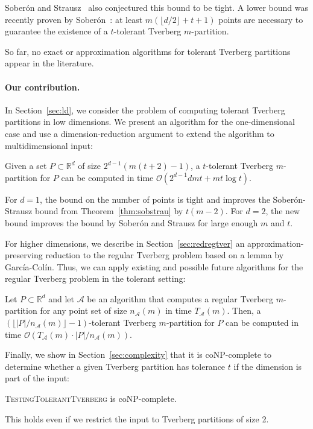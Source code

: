 \documentclass[oribibl,envcountsame,envcountsect]{llncs}
\newcommand{\mc}[1]{\ensuremath{\mathcal{#1}}}
\newcommand{\bo}[1]{\mathcal{O}(#1)}
\newcommand{\real}{\mathbb{R}}
\newcommand{\Soberon}{Sober\'{o}n}
\newcommand{\GarciaColin}{Garc\'{i}a-Col\'{i}n}
\begin{document}
\Soberon{} and Strausz~\cite{Soberon2012} also
conjectured this bound to be tight. A lower bound was recently
proven by \Soberon{}~\cite{Soberon2014}: at least
$m(\lfloor d/2\rfloor + t + 1)$ points are necessary to guarantee the
existence of a $t$-tolerant Tverberg $m$-partition.

So far,
no exact or approximation algorithms for tolerant Tverberg partitions appear in
the literature.

\paragraph{Our contribution.}
\newenvironment{prfTODO}{\begin{proof}[TODO]}{\qed\end{proof}}

In Section~\ref{sec:ld}, we consider the problem of computing
tolerant Tverberg partitions in low dimensions. We present an
algorithm for the one-dimensional case and use a dimension-reduction
argument to extend the algorithm to multidimensional input:
\begin{theorem}\label{thm:dr_tverberg}
  Given a set $P\subset \real^{d}$ of size $2^{d-1}(m(t+2) - 1)$,
  a $t$-tolerant Tverberg $m$-partition
  for $P$ can be computed in time $\bo{2^{d-1}dmt + mt \log t}$.
\end{theorem}
For $d=1$, the bound on the number of points is tight and improves
the \Soberon{}-Strausz bound from Theorem~\ref{thm:sobstrau} by
$t(m-2)$. For $d=2$, the new bound improves the bound
by \Soberon{} and Strausz for large enough $m$ and $t$.

For higher dimensions, we describe in Section~\ref{sec:redregtver} an
approximation-preserving reduction to the regular Tverberg problem based on a
lemma by \GarciaColin{}. Thus, we
can apply existing and possible future algorithms for the regular Tverberg
problem in the tolerant setting:

\begin{proposition} \label{apr:prop:cb}
  Let $P\subset \real^d$ and let $\mc{A}$ be an
  algorithm that computes a regular Tverberg $m$-partition
  for any point set of size $n_\mc{A}(m)$ in time $T_{\mc{A}}(m)$.
  Then, a $\left(\lfloor |P|/n_{\mc{A}}(m) \rfloor -1\right)$-tolerant Tverberg
  $m$-partition for $P$ can be computed in time
  $\mc{O}\left(T_{\mc{A}}(m) \cdot |P| / n_{\mc{A}}(m) \right)$.
\end{proposition}

Finally, we show in Section~\ref{sec:complexity} that it is
coNP-complete to determine whether a given Tverberg partition has
tolerance $t$ if the dimension is part of the input:
\begin{theorem}\label{thm:complexity}
  \textsc{TestingTolerantTverberg} is coNP-complete.
\end{theorem}
This holds even if we restrict the input to Tverberg partitions of size 2.
\end{document}
